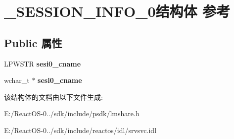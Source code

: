 \hypertarget{struct___s_e_s_s_i_o_n___i_n_f_o__0}{}\section{\+\_\+\+S\+E\+S\+S\+I\+O\+N\+\_\+\+I\+N\+F\+O\+\_\+0结构体 参考}
\label{struct___s_e_s_s_i_o_n___i_n_f_o__0}
\subsection*{Public 属性}
\begin{DoxyCompactItemize}
\item 
\mbox{\label{struct___s_e_s_s_i_o_n___i_n_f_o__0_a5074e241bd7c12bc81572b26eb3101c4}} 
L\+P\+W\+S\+TR {\bfseries sesi0\+\_\+cname}
\item 
\mbox{\label{struct___s_e_s_s_i_o_n___i_n_f_o__0_a52686d66dfa09b642b0fe34381b3618b}} 
wchar\+\_\+t $\ast$ {\bfseries sesi0\+\_\+cname}
\end{DoxyCompactItemize}


该结构体的文档由以下文件生成\+:\begin{DoxyCompactItemize}
\item 
E\+:/\+React\+O\+S-\/0../sdk/include/psdk/lmshare.\+h\item 
E\+:/\+React\+O\+S-\/0../sdk/include/reactos/idl/srvsvc.\+idl\end{DoxyCompactItemize}

